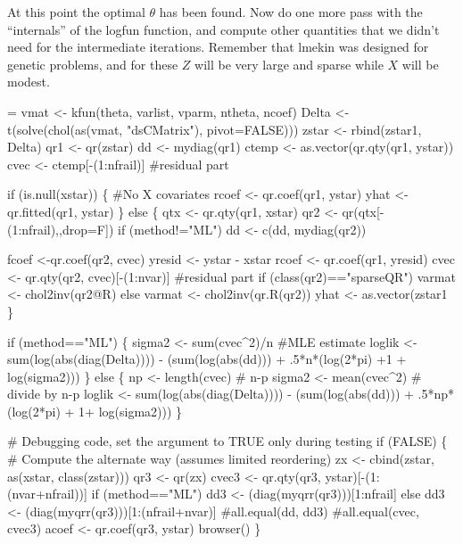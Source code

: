 \documentclass{article}
\begin{document}
At this point the optimal $\theta$ has been found.
Now do one more pass with the ``internals'' of the logfun
function, and compute other quantities that we didn't need    
for the intermediate iterations.
Remember that lmekin was designed for genetic problems,
and for these $Z$ will be very large and sparse while $X$ will
be modest. 
\begin{nwchunk}
=
 vmat <-  kfun(theta, varlist, vparm, ntheta, ncoef)
 Delta <- t(solve(chol(as(vmat, "dsCMatrix"), pivot=FALSE)))
 zstar <- rbind(zstar1, Delta)
 qr1 <- qr(zstar)
 dd <- mydiag(qr1)
 ctemp <- as.vector(qr.qty(qr1, ystar))
 cvec <- ctemp[-(1:nfrail)]  #residual part
 
 if (is.null(xstar)) \{ #No X covariates
     rcoef <- qr.coef(qr1, ystar)
     yhat <- qr.fitted(qr1, ystar)
 \}
 else \{
     qtx <- qr.qty(qr1, xstar)
     qr2 <- qr(qtx[-(1:nfrail),,drop=F])
     if (method!="ML") dd <- c(dd, mydiag(qr2))
 
     fcoef <-qr.coef(qr2, cvec)
     yresid <- ystar - xstar %
     rcoef <- qr.coef(qr1, yresid)
     cvec <- qr.qty(qr2, cvec)[-(1:nvar)] #residual part
     if (class(qr2)=="sparseQR") varmat <- chol2inv(qr2@R)
     else varmat <- chol2inv(qr.R(qr2))
     yhat <- as.vector(zstar1 %
 \}
 
 if (method=="ML") \{
     sigma2 <- sum(cvec^2)/n  #MLE estimate  
     loglik <- sum(log(abs(diag(Delta)))) - 
           (sum(log(abs(dd))) + .5*n*(log(2*pi) +1 + log(sigma2)))
 \}
 else \{
     np <- length(cvec)  # n-p
     sigma2 <- mean(cvec^2)  # divide by n-p
     loglik <- sum(log(abs(diag(Delta)))) -
         (sum(log(abs(dd))) + .5*np*(log(2*pi) + 1+ log(sigma2)))
 \}
         
 # Debugging code, set the argument to TRUE only during testing
 if (FALSE) \{
     # Compute the alternate way (assumes limited reordering)
     zx <- cbind(zstar, as(xstar, class(zstar)))
     qr3 <- qr(zx)
     cvec3 <- qr.qty(qr3, ystar)[-(1:(nvar+nfrail))]
     if (method=="ML")  dd3 <- (diag(myqrr(qr3)))[1:nfrail]
     else               dd3 <- (diag(myqrr(qr3)))[1:(nfrail+nvar)]
     #all.equal(dd, dd3)
     #all.equal(cvec, cvec3)
     acoef <- qr.coef(qr3, ystar)
     browser()
 \}
\end{nwchunk}
\end{document}
